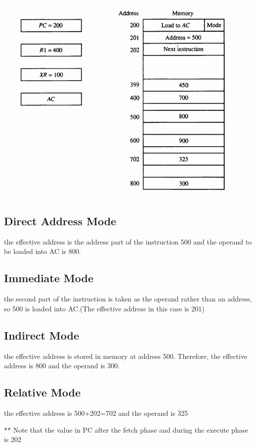 \documentclass[12pt]{article}
\begin{document}
\begin{center}
	\includegraphics[scale=.7]{./AddressingModes.png}
\end{center}

\subsection{Direct Address Mode}
the effective address is the address part of the instruction 500 and the operand to be loaded into AC is 800.

\subsection{Immediate Mode}
the second part of the instruction is taken as the operand rather than an address, so 500 is loaded into AC.(The effective address in this case is 201)

\subsection{Indirect Mode}
the effective address is stored in memory at address 500.
Therefore, the effective address is 800 and the operand is 300.

\subsection{Relative Mode}
the effective address is 500+202=702
and the operand is 325

** Note that the value in PC after the fetch phase and during the execute phase is 202
\end{document}
